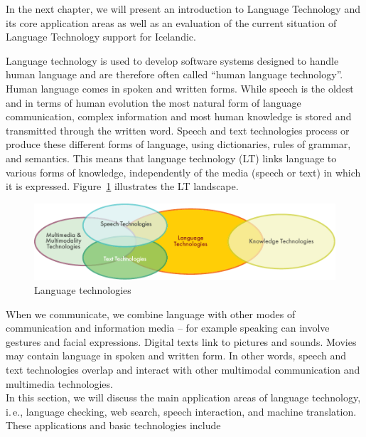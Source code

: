 \begin{multicols}{2}
In the next chapter, we will present an introduction to Language Technology and its core application areas as well as an evaluation of the current situation of Language Technology support for Icelandic.
\end{multicols}

\clearpage


\begin{multicols}{2}

Language technology is used to develop software systems designed to handle human language and are therefore often called “human language technology”. Human language comes in spoken and written forms. While speech is the oldest and in terms of human evolution the most natural form of language communication, complex information and most human knowledge is stored and transmitted through the written word. Speech and text technologies process or produce these different forms of language, using dictionaries, rules of grammar, and semantics. This means that language technology (LT) links language to various forms of knowledge, independently of the media (speech or text) in which it is expressed. Figure~\ref{fig:ltincontext_en} illustrates the LT landscape.

\begin{figure}[htb]
  \center
  \includegraphics[width=\textwidth]{../_media/english/language_technologies}
  \caption{Language technologies}
  \label{fig:ltincontext_en}
\end{figure}

When we communicate, we combine language with other modes of communication and information media -- for example speaking can involve gestures and facial expressions. Digital texts link to pictures and sounds. Movies may contain language in spoken and written form. In other words, speech and text technologies overlap and interact with other multimodal communication and multimedia technologies.\\ 
In this section, we will discuss the main application areas of language technology, i.\,e., language checking, web search, speech interaction, and machine translation. These applications and basic technologies include 


\end{multicols}
